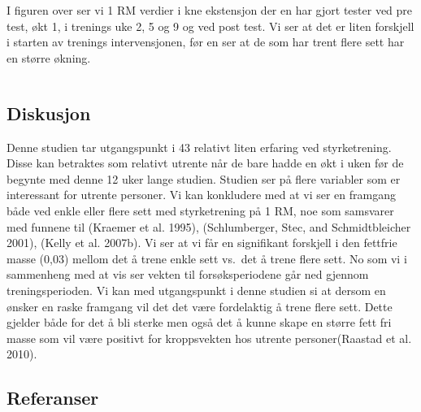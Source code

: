 \documentclass[
  letterpaper,
  DIV=11,
  numbers=noendperiod]{scrartcl}
\begin{document}
I figuren over ser vi 1 RM verdier i kne ekstensjon der en har gjort
tester ved pre test, økt 1, i trenings uke 2, 5 og 9 og ved post test.
Vi ser at det er liten forskjell i starten av trenings intervensjonen,
før en ser at de som har trent flere sett har en større økning.

\begin{verbatim}
\end{verbatim}

\hypertarget{diskusjon}{%
\subsection{Diskusjon}\label{diskusjon}}

Denne studien tar utgangspunkt i 43 relativt liten erfaring ved
styrketrening. Disse kan betraktes som relativt utrente når de bare
hadde en økt i uken før de begynte med denne 12 uker lange studien.
Studien ser på flere variabler som er interessant for utrente personer.
Vi kan konkludere med at vi ser en framgang både ved enkle eller flere
sett med styrketrening på 1 RM, noe som samsvarer med funnene til
(Kraemer et al. 1995), (Schlumberger, Stec, and Schmidtbleicher 2001),
(Kelly et al. 2007b). Vi ser at vi får en signifikant forskjell i den
fettfrie masse (0,03) mellom det å trene enkle sett vs.~det å trene
flere sett. No som vi i sammenheng med at vis ser vekten til
forsøksperiodene går ned gjennom treningsperioden. Vi kan med
utgangspunkt i denne studien si at dersom en ønsker en raske framgang
vil det det være fordelaktig å trene flere sett. Dette gjelder både for
det å bli sterke men også det å kunne skape en større fett fri masse som
vil være positivt for kroppsvekten hos utrente personer(Raastad et al.
2010).

\hypertarget{referanser}{%
\subsection*{Referanser}\label{referanser}}
\end{document}
